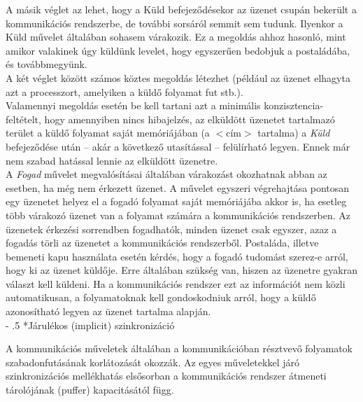 \documentclass[tikz,12pt,margin=0px]{article}
\makeatletter
\renewcommand\paragraph{%
	\@startsection{paragraph}{4}{0mm}%
	{-\baselineskip}%
	{.5\baselineskip}%
	{\normalfont\normalsize\bfseries}}
\makeatother
\begin{document}
    \noindent A másik véglet az lehet, hogy a Küld befejeződésekor az üzenet csupán bekerült a kommunikációs rendszerbe, de további sorsáról semmit sem tudunk. Ilyenkor a Küld művelet általában sohasem várakozik. Ez a megoldás ahhoz hasonló, mint amikor valakinek úgy küldünk levelet, hogy egyszerűen bedobjuk a postaládába, és továbbmegyünk.\\

    \noindent A két véglet között számos köztes megoldás létezhet (például az üzenet elhagyta azt a processzort, amelyiken a küldő folyamat fut stb.).\\

    \noindent Valamennyi megoldás esetén be kell tartani azt a minimális konzisztencia-feltételt, hogy amennyiben nincs hibajelzés, az elküldött üzenetet tartalmazó terület a küldő folyamat saját memóriájában (a $<\text{cím}>$ tartalma) a \emph{Küld} befejeződése után – akár a következő utasítással – felülírható legyen. Ennek már nem szabad hatással lennie az elküldött üzenetre.\\

    \noindent A \emph{Fogad} művelet megvalósításai általában várakozást okozhatnak abban az esetben, ha még nem érkezett üzenet. A művelet egyszeri végrehajtása pontosan egy üzenetet helyez el a fogadó folyamat saját memóriájába akkor is, ha esetleg több várakozó üzenet van a folyamat számára a kommunikációs rendszerben. Az üzenetek érkezési sorrendben fogadhatók, minden üzenet csak egyszer, azaz a fogadás törli az üzenetet a kommunikációs rendszerből. Postaláda, illetve bemeneti kapu használata esetén kérdés, hogy a fogadó tudomást szerez-e arról, hogy ki az üzenet küldője. Erre általában szükség van, hiszen az üzenetre gyakran választ kell küldeni. Ha a kommunikációs rendszer ezt az információt nem közli automatikusan, a folyamatoknak kell gondoskodniuk arról, hogy a küldő azonosítható legyen az üzenet tartalma alapján.\\

    \paragraph*{Járulékos (implicit) szinkronizáció}

    \noindent A kommunikációs műveletek általában a kommunikációban résztvevő folyamatok szabadonfutásának korlátozását okozzák. Az egyes műveletekkel járó szinkronizációs mellékhatás elsősorban a kommunikációs rendszer átmeneti tárolójának (puffer) kapacitásától függ.\\
\end{document}
